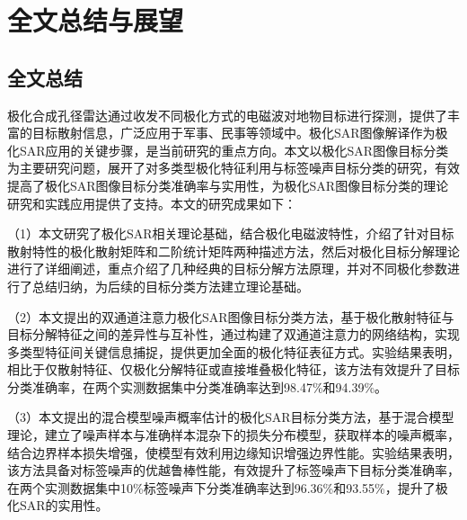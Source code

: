 \chapter{全文总结与展望}
\section{全文总结}
极化合成孔径雷达通过收发不同极化方式的电磁波对地物目标进行探测，提供了丰富的目标散射信息，广泛应用于军事、民事等领域中。极化SAR图像解译作为极化SAR应用的关键步骤，是当前研究的重点方向。本文以极化SAR图像目标分类为主要研究问题，展开了对多类型极化特征利用与标签噪声目标分类的研究，有效提高了极化SAR图像目标分类准确率与实用性，为极化SAR图像目标分类的理论研究和实践应用提供了支持。本文的研究成果如下：


（1）本文研究了极化SAR相关理论基础，结合极化电磁波特性，介绍了针对目标散射特性的极化散射矩阵和二阶统计矩阵两种描述方法，然后对极化目标分解理论进行了详细阐述，重点介绍了几种经典的目标分解方法原理，并对不同极化参数进行了总结归纳，为后续的目标分类方法建立理论基础。

（2）本文提出的双通道注意力极化SAR图像目标分类方法，基于极化散射特征与目标分解特征之间的差异性与互补性，通过构建了双通道注意力的网络结构，实现多类型特征间关键信息捕捉，提供更加全面的极化特征表征方式。实验结果表明，相比于仅散射特征、仅极化分解特征或直接堆叠极化特征，该方法有效提升了目标分类准确率，在两个实测数据集中分类准确率达到98.47\%和94.39\%。

（3）本文提出的混合模型噪声概率估计的极化SAR目标分类方法，基于混合模型理论，建立了噪声样本与准确样本混杂下的损失分布模型，获取样本的噪声概率，结合边界样本损失增强，使模型有效利用边缘知识增强边界性能。实验结果表明，该方法具备对标签噪声的优越鲁棒性能，有效提升了标签噪声下目标分类准确率，在两个实测数据集中10\%标签噪声下分类准确率达到96.36\%和93.55\%，提升了极化SAR的实用性。


